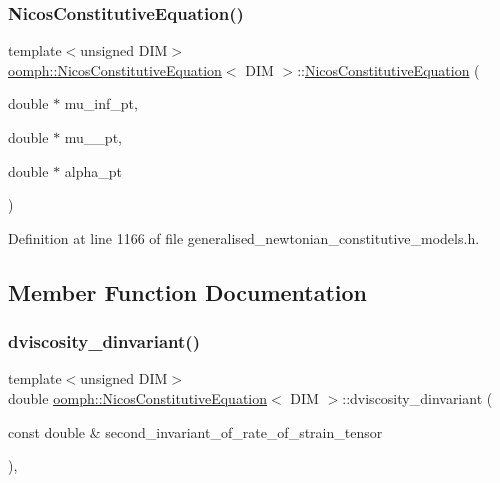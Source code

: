 \subsubsection{\texorpdfstring{Nicos\+Constitutive\+Equation()}{NicosConstitutiveEquation()}}
{\footnotesize\ttfamily template$<$unsigned D\+IM$>$ \\
\hyperlink{classoomph_1_1NicosConstitutiveEquation}{oomph\+::\+Nicos\+Constitutive\+Equation}$<$ D\+IM $>$\+::\hyperlink{classoomph_1_1NicosConstitutiveEquation}{Nicos\+Constitutive\+Equation} (\begin{DoxyParamCaption}\item[{double $\ast$}]{mu\+\_\+inf\+\_\+pt,  }\item[{double $\ast$}]{mu\+\_\+\_\+pt,  }\item[{double $\ast$}]{alpha\+\_\+pt }\end{DoxyParamCaption})\hspace{0.3cm}{\ttfamily [inline]}}



Definition at line 1166 of file generalised\+\_\+newtonian\+\_\+constitutive\+\_\+models.\+h.



\subsection{Member Function Documentation}
\mbox{\label{classoomph_1_1NicosConstitutiveEquation_a470905abb0522dd441e1e32fbaabb9c3}} 
\subsubsection{\texorpdfstring{dviscosity\+\_\+dinvariant()}{dviscosity\_dinvariant()}}
{\footnotesize\ttfamily template$<$unsigned D\+IM$>$ \\
double \hyperlink{classoomph_1_1NicosConstitutiveEquation}{oomph\+::\+Nicos\+Constitutive\+Equation}$<$ D\+IM $>$\+::dviscosity\+\_\+dinvariant (\begin{DoxyParamCaption}\item[{const double \&}]{second\+\_\+invariant\+\_\+of\+\_\+rate\+\_\+of\+\_\+strain\+\_\+tensor }\end{DoxyParamCaption})\hspace{0.3cm}{\ttfamily [inline]}, {\ttfamily [virtual]}}

